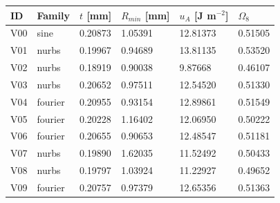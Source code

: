 \begin{tabular}{llllll}
\toprule
ID & Family & $t$ [mm] & $R_{min}$ [mm] & $u_A$ [J m$^{-2}$] & $\Omega_8$ \\
\midrule
V00 & sine & 0.20873 & 1.05391 & 12.81373 & 0.51505 \\
V01 & nurbs & 0.19967 & 0.94689 & 13.81135 & 0.53520 \\
V02 & nurbs & 0.18919 & 0.90038 & 9.87668 & 0.46107 \\
V03 & nurbs & 0.20652 & 0.97511 & 12.54520 & 0.51330 \\
V04 & fourier & 0.20955 & 0.93154 & 12.89861 & 0.51549 \\
V05 & fourier & 0.20228 & 1.16402 & 12.06950 & 0.50222 \\
V06 & fourier & 0.20655 & 0.90653 & 12.48547 & 0.51181 \\
V07 & nurbs & 0.19890 & 1.62035 & 11.52492 & 0.50433 \\
V08 & nurbs & 0.19797 & 1.03924 & 11.22927 & 0.49652 \\
V09 & fourier & 0.20757 & 0.97379 & 12.65356 & 0.51363 \\
\bottomrule
\end{tabular}
